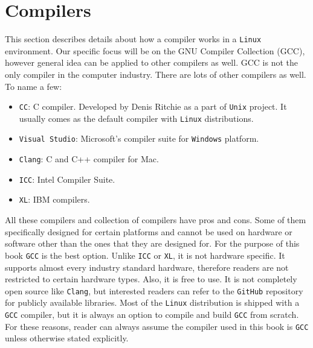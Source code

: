 \chapter{Compilers} \label{chap-compilers}
This section describes details about how a compiler works in a \texttt{Linux} 
environment. Our specific focus will be on the GNU Compiler Collection (GCC),
however general idea can be applied to other compilers as well.
\newline \newline
GCC is not the only compiler in the computer industry. There are lots of other
compilers as well. To name a few:
\begin{itemize}
  \item \texttt{CC}: C compiler. Developed by Denis Ritchie as a part of \texttt{Unix} project.
  It usually comes as the default compiler with \texttt{Linux} distributions. 
  \item \texttt{Visual Studio}: Microsoft's compiler suite for \texttt{Windows} platform.
  \item \texttt{Clang}: C and C++ compiler for Mac.
  \item \texttt{ICC}: Intel Compiler Suite.
  \item \texttt{XL}: IBM compilers. 
\end{itemize}
All these compilers and collection of compilers have pros and cons. Some of them 
specifically designed for certain platforms and cannot be used on hardware or 
software other than the ones that they are designed for. 
\newline \newline
For the purpose of this book \texttt{GCC} is the best option. Unlike \texttt{ICC}
or \texttt{XL}, it is not hardware specific. It supports almost every industry 
standard hardware, therefore readers are not restricted to certain hardware types.
Also, it is free to use. It is not completely open source like \texttt{Clang}, but
interested readers can refer to the \texttt{GitHub} repository for publicly 
available libraries. Most of the \texttt{Linux} distribution is shipped with a
\texttt{GCC} compiler, but it is always an option to compile and build \texttt{GCC}
from scratch.
\newline \newline
For these reasons, reader can always assume the compiler used in this book is
\texttt{GCC} unless otherwise stated explicitly.

